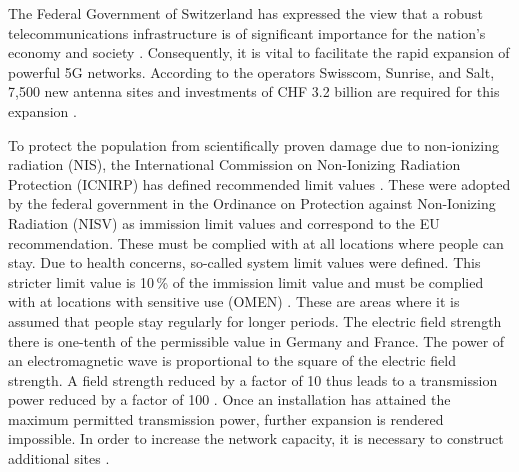 \begin{English}
    The Federal Government of Switzerland has expressed the view that a robust telecommunications infrastructure is of significant importance for the nation's economy and society \cite{bundesratNachhaltigesMobilfunknetzBericht2022}. Consequently, it is vital to facilitate the rapid expansion of powerful 5G networks. According to the operators Swisscom, Sunrise, and Salt, 7,500 new antenna sites and investments of CHF 3.2 billion are required for this expansion \cite{bundesratNachhaltigesMobilfunknetzBericht2022}.

    To protect the population from scientifically proven damage due to non-ionizing radiation (NIS), the International Commission on Non-Ionizing Radiation Protection (ICNIRP) has defined recommended limit values \cite{baumannMitVerordnungUeber2005}. These were adopted by the federal government in the Ordinance on Protection against Non-Ionizing Radiation (NISV) as immission limit values and correspond to the EU recommendation. These must be complied with at all locations where people can stay. Due to health concerns, so-called system limit values were defined. This stricter limit value is 10\,\% of the immission limit value and must be complied with at locations with sensitive use (OMEN) \cite{baumannMitVerordnungUeber2005}. These are areas where it is assumed that people stay regularly for longer periods. The electric field strength there is one-tenth of the permissible value in Germany and France. The power of an electromagnetic wave is proportional to the square of the electric field strength. A field strength reduced by a factor of 10 thus leads to a transmission power reduced by a factor of 100 \cite{chance5gAnlagegrenzwerteImMobilfunk}. Once an installation has attained the maximum permitted transmission power, further expansion is rendered impossible. In order to increase the network capacity, it is necessary to construct additional sites \cite{bundesratNachhaltigesMobilfunknetzBericht2022}.
\end{English}



